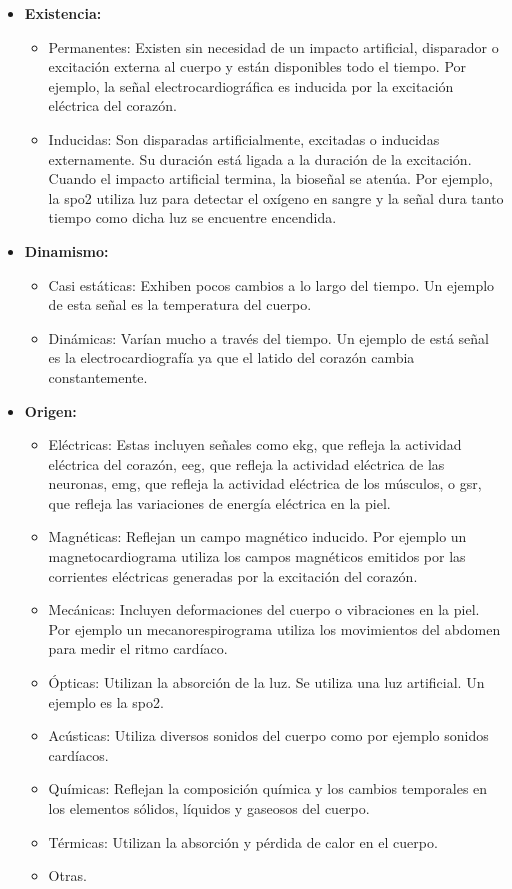 \begin{itemize}
	\item \textbf{Existencia:}
		\begin{itemize}
			\item Permanentes: Existen sin necesidad de un impacto artificial, disparador o excitación externa al cuerpo y están disponibles todo el tiempo. Por ejemplo, la señal electrocardiográfica es inducida por la excitación eléctrica del corazón.
			\item Inducidas: Son disparadas artificialmente, excitadas o inducidas externamente. Su duración está ligada a la duración de la excitación. Cuando el impacto artificial termina, la bioseñal se atenúa. Por ejemplo, la \gls{spo2} utiliza luz para detectar el oxígeno en sangre y la señal dura tanto tiempo como dicha luz se encuentre encendida.
		\end{itemize}
	\item \textbf{Dinamismo:}
		\begin{itemize}
			\item Casi estáticas:  Exhiben pocos cambios a lo largo del tiempo. Un ejemplo de esta señal es la temperatura del cuerpo.
			\item Dinámicas: Varían mucho a través del tiempo. Un ejemplo de está señal es la electrocardiografía ya que el latido del corazón cambia constantemente.
		\end{itemize}
	\item \textbf{Origen:}
		\begin{itemize}
			\item Eléctricas: Estas incluyen señales como \gls{ekg}, que refleja la actividad eléctrica del corazón, \gls{eeg}, que refleja la actividad eléctrica de las neuronas,  \gls{emg}, que refleja la actividad eléctrica de los músculos, o \gls{gsr}, que refleja las variaciones de energía eléctrica en la piel.
			\item Magnéticas: Reflejan un campo magnético inducido. Por ejemplo un magnetocardiograma utiliza los campos magnéticos emitidos por las corrientes eléctricas generadas por la excitación del corazón.
			\item Mecánicas: Incluyen deformaciones del cuerpo o vibraciones en la piel. Por ejemplo un mecanorespirograma utiliza los movimientos del abdomen para medir el ritmo cardíaco.
			\item Ópticas: Utilizan la absorción de la luz. Se utiliza una luz artificial. Un ejemplo es la \gls{spo2}.
			\item Acústicas: Utiliza diversos sonidos del cuerpo como por ejemplo sonidos cardíacos.
			\item Químicas: Reflejan la composición química y los cambios temporales en los elementos sólidos, líquidos y gaseosos del cuerpo.
			\item Térmicas: Utilizan la absorción y pérdida de calor en el cuerpo.
			\item Otras.
	\end{itemize}
\end{itemize}

